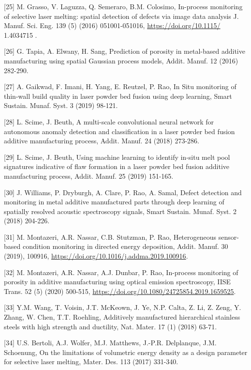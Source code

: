 \documentclass[10pt]{article}
\begin{document}
[25] M. Grasso, V. Laguzza, Q. Semeraro, B.M. Colosimo, In-process monitoring of selective laser melting: spatial detection of defects via image data analysis J. Manuf. Sci. Eng. 139 (5) (2016) 051001-051016, \href{https://doi.org/10.1115/}{https://doi.org/10.1115/} 1.4034715 .

[26] G. Tapia, A. Elwany, H. Sang, Prediction of porosity in metal-based additive manufacturing using spatial Gaussian process models, Addit. Manuf. 12 (2016) 282-290.

[27] A. Gaikwad, F. Imani, H. Yang, E. Reutzel, P. Rao, In Situ monitoring of thin-wall build quality in laser powder bed fusion using deep learning, Smart Sustain. Munaf. Syst. 3 (2019) 98-121.

[28] L. Scime, J. Beuth, A multi-scale convolutional neural network for autonomous anomaly detection and classification in a laser powder bed fusion additive manufacturing process, Addit. Manuf. 24 (2018) 273-286.

[29] L. Scime, J. Beuth, Using machine learning to identify in-situ melt pool signatures indicative of flaw formation in a laser powder bed fusion additive manufacturing process, Addit. Manuf. 25 (2019) 151-165.

[30] J. Williams, P. Dryburgh, A. Clare, P. Rao, A. Samal, Defect detection and monitoring in metal additive manufactured parts through deep learning of spatially resolved acoustic spectroscopy signals, Smart Sustain. Munaf. Syst. 2 (2018) 204-226.

[31] M. Montazeri, A.R. Nassar, C.B. Stutzman, P. Rao, Heterogeneous sensor-based condition monitoring in directed energy deposition, Addit. Manuf. 30 (2019), 100916, \href{https://doi.org/10.1016/j.addma.2019.100916}{https://doi.org/10.1016/j.addma.2019.100916}.

[32] M. Montazeri, A.R. Nassar, A.J. Dunbar, P. Rao, In-process monitoring of porosity in additive manufacturing using optical emission spectroscopy, IISE Trans. 52 (5) (2020) 500-515, \href{https://doi.org/10.1080/24725854.2019.1659525}{https://doi.org/10.1080/24725854.2019.1659525}.

[33] Y.M. Wang, T. Voisin, J.T. McKeown, J. Ye, N.P. Calta, Z. Li, Z. Zeng, Y. Zhang, W. Chen, T.T. Roehling, Additively manufactured hierarchical stainless steels with high strength and ductility, Nat. Mater. 17 (1) (2018) 63-71.

[34] U.S. Bertoli, A.J. Wolfer, M.J. Matthews, J.-P.R. Delplanque, J.M. Schoenung, On the limitations of volumetric energy density as a design parameter for selective laser melting, Mater. Des. 113 (2017) 331-340.
\end{document}
